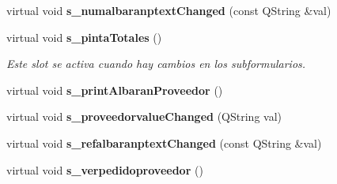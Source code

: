 \begin{CompactItemize}
\item 
virtual void {\bf s\_\-numalbaranptext\-Changed} (const QString \&val)\label{classAlbaranProveedorView_i13}

\item 
virtual void {\bf s\_\-pinta\-Totales} ()\label{classAlbaranProveedorView_i14}

\begin{CompactList}\small\item\em Este slot se activa cuando hay cambios en los subformularios. \item\end{CompactList}\item 
virtual void {\bf s\_\-print\-Albaran\-Proveedor} ()\label{classAlbaranProveedorView_i15}

\item 
virtual void {\bf s\_\-proveedorvalue\-Changed} (QString val)\label{classAlbaranProveedorView_i16}

\item 
virtual void {\bf s\_\-refalbaranptext\-Changed} (const QString \&val)\label{classAlbaranProveedorView_i17}

\item 
virtual void {\bf s\_\-verpedidoproveedor} ()\label{classAlbaranProveedorView_i18}

\end{CompactItemize}
